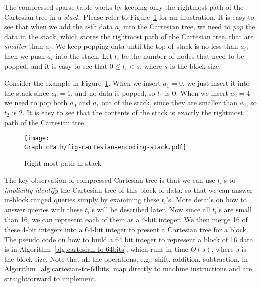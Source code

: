 The compressed sparse table works by keeping only the {\rm rightmost}
path of the Cartesian tree in a {\em stack}.  Please refer to
Figure~\ref{fig:interval-cartesian} for an illustration.  It is easy
to see that when we add the $i$-th data $a_i$ into the Cartesian tree,
we need to {\em pop} the data in the stack, which stores the rightmost
path of the Cartesian tree, that are {\em smaller} than $a_i$.  We
keep popping data until the top of stack is no less than $a_i$, then
we push $a_i$ into the stack.  Let $t_i$ be the number of nodes that
need to be popped, and it is easy to see that $0 \le t_i < s$, where
$s$ is the block size.  

Consider the example in Figure~\ref{fig:interval-cartesian}.  When we
insert $a_1 = 0$, we just insert it into the stack since $a_0 = 1$,
and no data is popped, so $t_1$ is $0$.  When we insert $a_2 = 4$ we
need to pop both $a_0$ and $a_1$ out of the stack, since they are
smaller than $a_2$, so $t_2$ is $2$.  It is easy to see that the
contents of the stack is exactly the rightmost path of the Cartesian
tree.

\begin{figure}[!thb]
  \centering
  \texttt{[image: \\GraphicPath/fig-cartesian-encoding-stack.pdf]}
  \caption{Right most path in stack}
  \label{fig:interval-cartesian}
\end{figure}


The key observation of compressed Cartesian tree is that we can use
$t_i$'s to {\em implicitly identify} the Cartesian tree of this block
of data, so that we can answer in-block ranged queries simply by
examining these $t_i$'s.  More details on how to answer queries with
these $t_i$'s will be described later.  Now since all $t_i$'s are
small than 16, we can represent each of them as a 4-bit integer.  We
then merge 16 of these 4-bit integers into a 64-bit integer to present
a Cartesian tree for a block.  The pseudo code on how to build a 64
bit integer to represent a block of 16 data is in
Algorithm~\ref{alg:cartesian-to-64bits}, which runs in time
$O(s)$. where $s$ is the block size.  Note that all the operations,
e.g., shift, addition, subtraction, in
Algorithm~\ref{alg:cartesian-to-64bits} map directly to machine
instructions and are straightforward to implement.



